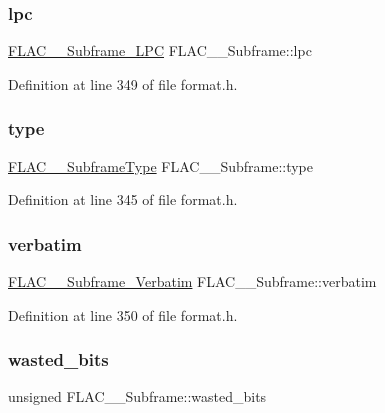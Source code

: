 \subsubsection{\texorpdfstring{lpc}{lpc}}
{\footnotesize\ttfamily \mbox{\hyperlink{struct_f_l_a_c_____subframe___l_p_c}{F\+L\+A\+C\+\_\+\+\_\+\+Subframe\+\_\+\+L\+PC}} F\+L\+A\+C\+\_\+\+\_\+\+Subframe\+::lpc}



Definition at line 349 of file format.\+h.

\mbox{\label{struct_f_l_a_c_____subframe_a1de133ee69f416636e24a990d4bd6b44}} 
\subsubsection{\texorpdfstring{type}{type}}
{\footnotesize\ttfamily \mbox{\hyperlink{group__flac__format_ga1f431eaf213e74d7747589932d263348}{F\+L\+A\+C\+\_\+\+\_\+\+Subframe\+Type}} F\+L\+A\+C\+\_\+\+\_\+\+Subframe\+::type}



Definition at line 345 of file format.\+h.

\mbox{\label{struct_f_l_a_c_____subframe_ae7b7d3263298a9326f3ac3e9d56b2a6c}} 
\subsubsection{\texorpdfstring{verbatim}{verbatim}}
{\footnotesize\ttfamily \mbox{\hyperlink{struct_f_l_a_c_____subframe___verbatim}{F\+L\+A\+C\+\_\+\+\_\+\+Subframe\+\_\+\+Verbatim}} F\+L\+A\+C\+\_\+\+\_\+\+Subframe\+::verbatim}



Definition at line 350 of file format.\+h.

\mbox{\label{struct_f_l_a_c_____subframe_a96a6848ded4e90e26d54f0dd7066c306}} 
\subsubsection{\texorpdfstring{wasted\_bits}{wasted\_bits}}
{\footnotesize\ttfamily unsigned F\+L\+A\+C\+\_\+\+\_\+\+Subframe\+::wasted\+\_\+bits}



